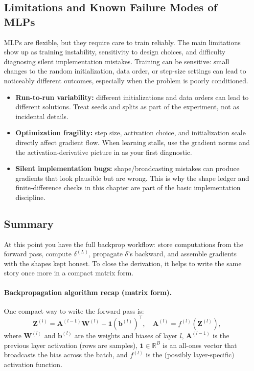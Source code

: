 \subsection{Limitations and Known Failure Modes of MLPs}
\label{sec:backprop_limitations_of_multi_layer_perceptrons}

MLPs are flexible, but they require care to train reliably. The main limitations show up as training instability, sensitivity to design choices, and difficulty diagnosing silent implementation mistakes. Training can be sensitive: small changes to the random initialization, data order, or step-size settings can lead to noticeably different outcomes, especially when the problem is poorly conditioned.

\begin{itemize}
    \item \textbf{Run-to-run variability:} different initializations and data orders can lead to different solutions. Treat seeds and splits as part of the experiment, not as incidental details.
    \item \textbf{Optimization fragility:} step size, activation choice, and initialization scale directly affect gradient flow. When learning stalls, use the gradient norms and the activation-derivative picture in  as your first diagnostic.
    \item \textbf{Silent implementation bugs:} shape/broadcasting mistakes can produce gradients that look plausible but are wrong. This is why the shape ledger and finite-difference checks in this chapter are part of the basic implementation discipline.
\end{itemize}

\subsection{Summary}
\label{sec:backprop_conclusion_of_multi_layer_perceptron_derivations}

At this point you have the full backprop workflow: store computations from the forward pass, compute \(\delta^{(L)}\), propagate \(\delta\)'s backward, and assemble gradients with the shapes kept honest. To close the derivation, it helps to write the same story once more in a compact matrix form.

\paragraph{Backpropagation algorithm recap (matrix form).}
One compact way to write the forward pass is:
\[
\mathbf{Z}^{(l)} = \mathbf{A}^{(l-1)}\mathbf{W}^{(l)} + \mathbf{1}(\mathbf{b}^{(l)})^\top,\quad \mathbf{A}^{(l)} = f^{(l)}(\mathbf{Z}^{(l)}),
\]
where \(\mathbf{W}^{(l)}\) and \(\mathbf{b}^{(l)}\) are the weights and biases of layer \( l \), \(\mathbf{A}^{(l-1)}\) is the previous layer activation (rows are samples), \(\mathbf{1}\in\mathbb{R}^{B}\) is an all-ones vector that broadcasts the bias across the batch, and \(f^{(l)}\) is the (possibly layer-specific) activation function.

